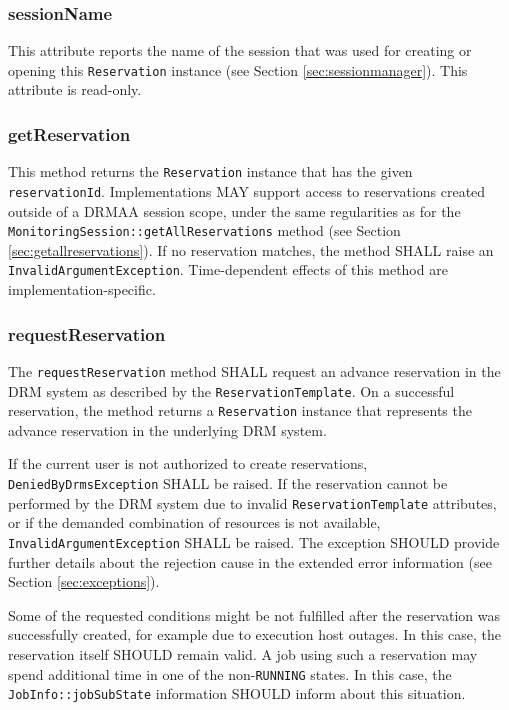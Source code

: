 \documentclass{article}
\newcommand{\h}[1]{\lstinline|#1|}
\begin{document}
\subsubsection{sessionName}

This attribute reports the name of the session that was used for creating or opening this \h{Reservation} instance  (see Section \ref{sec:sessionmanager}). This attribute is read-only.

\subsubsection{getReservation}

This method returns the \h{Reservation} instance that has the given \h{reservationId}. Implementations MAY support access to reservations created outside of a DRMAA session scope, under the same regularities as for the \h{MonitoringSession::getAllReservations} method (see Section \ref{sec:getallreservations}). If no reservation matches, the method SHALL raise an \h{InvalidArgumentException}.  Time-dependent effects of this method are implementation-specific. 

\subsubsection{requestReservation}

The \h{requestReservation} method SHALL request an advance reservation in the DRM system as described by the \h{ReservationTemplate}. On a successful reservation, the method returns a \h{Reservation} instance that represents the advance reservation in the underlying DRM system.

If the current user is not authorized to create reservations, \h{DeniedByDrmsException}  SHALL be raised. If the reservation cannot be performed by the DRM system due to invalid \h{ReservationTemplate} attributes, or if the demanded combination of resources is not available, \h{InvalidArgumentException} SHALL be raised. The exception SHOULD provide further details about the rejection cause in the extended error information (see Section \ref{sec:exceptions}).

Some of the requested conditions might be not fulfilled after the reservation was successfully created, for example due to execution host outages. In this case, the reservation itself SHOULD remain valid. A job using such a reservation may spend additional time in one of the non-\h{RUNNING} states. In this case, the \h{JobInfo::jobSubState} information SHOULD inform about this situation.
\end{document}
